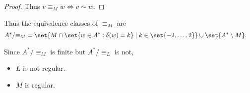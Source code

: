 \documentclass[12pt]{article}
\begin{document}
\begin{solution}
\begin{proof}
        Thus $v \equiv_M w \iff v \sim w$.
    \end{proof}
    Thus the equivalence classes of $\equiv_M$ are \begin{align*}
        A^*/{\equiv_M} &= \set{M \cap \set{w \in A^* : \delta(w) = k} \mid k \in
        \set{-2, \dots, 2}} \cup \set{A^* \setminus M}.
    \end{align*}

    Since $A^*/{\equiv_M}$ is finite but $A^*/{\equiv_L}$ is not,
    \begin{itemize}
        \item $L$ is not regular.
        \item $M$ is regular. \qedhere
    \end{itemize}
\end{solution}
\end{document}
